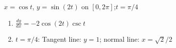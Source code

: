 {$x=\cos t$, $y=\sin(2t)$ on $[0,2\pi]$;\quad $t=\pi/4$}
{\begin{enumerate}
	\item $\frac{dy}{dx} = -2\cos(2t)\csc t$
	\item	$t=\pi/4$: Tangent line: $y=1$; normal line: $x=\sqrt{2}/2$
\end{enumerate}
}
